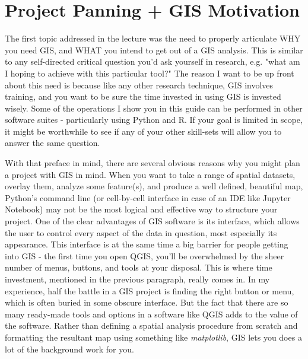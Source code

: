 \documentclass{article}
\begin{document}
\section{Project Panning + GIS Motivation}

The first topic addressed in the lecture was the need to properly articulate WHY you need GIS, and WHAT you intend to get out of a GIS analysis. This is similar to any self-directed critical question you'd ask yourself in research, e.g. "what am I hoping to achieve with this particular tool?" The reason I want to be up front about this need is because like any other research technique, GIS involves training, and you want to be sure the time invested in using GIS is invested wisely. Some of the operations I show you in this guide can be performed in other software suites - particularly using Python and R. If your goal is limited in scope, it might be worthwhile to see if any of your other skill-sets will allow you to answer the same question. 

With that preface in mind, there are several obvious reasons why you might plan a project with GIS in mind. When you want to take a range of spatial datasets, overlay them, analyze some feature(s), and produce a well defined, beautiful map, Python's command line (or cell-by-cell interface in case of an IDE like Jupyter Notebook) may not be the most logical and effective way to structure your project. One of the clear advantages of GIS software is its interface, which allows the user to control every aspect of the data in question, most especially its appearance. This interface is at the same time a big barrier for people getting into GIS - the first time you open QGIS, you'll be overwhelmed by the sheer number of menus, buttons, and tools at your disposal. This is where time investment, mentioned in the previous paragraph, really comes in. In my experience, half the battle in a GIS project is finding the right button or menu, which is often buried in some obscure interface. But the fact that there are so many ready-made tools and options in a software like QGIS adds to the value of the software. Rather than defining a spatial analysis procedure from scratch and formatting the resultant map using something like \textit{matplotlib}, GIS lets you does a lot of the background work for you. 
\end{document}
